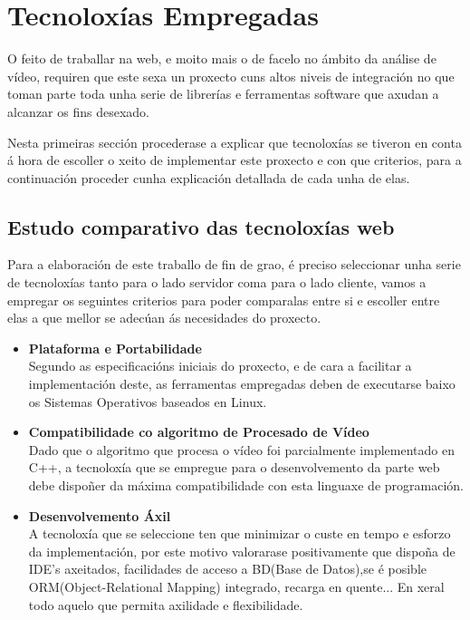\chapter{Tecnoloxías Empregadas}
    
    O feito de traballar na web, e moito mais o de facelo no ámbito da análise de vídeo, requiren 
    que este sexa un proxecto cuns altos niveis de integración no que toman parte toda unha serie 
    de librerías e ferramentas software que axudan a alcanzar os fins desexado.
    
    Nesta primeiras sección procederase a explicar que tecnoloxías se tiveron en conta á hora de 
    escoller o xeito de implementar este proxecto e con que criterios, para a continuación proceder
    cunha explicación detallada de cada unha de elas. 
    
    \section{Estudo comparativo das tecnoloxías web}
    \label{sec:estudoTecnoloxias}
    Para a elaboración de este traballo de fin de grao, é preciso seleccionar unha serie de
    tecnoloxías tanto para o lado servidor coma para o lado cliente, vamos a empregar os seguintes
    criterios para poder comparalas entre si e escoller entre elas a que mellor se adecúan ás 
    necesidades do proxecto.

    \begin{itemize}

        \item {\textbf{Plataforma e Portabilidade\\}}
            Segundo as especificacións iniciais do proxecto, e de cara a facilitar a 
            implementación deste, as ferramentas empregadas deben de executarse baixo os
            Sistemas Operativos baseados en Linux.

        \item {\textbf{Compatibilidade co algoritmo de Procesado de Vídeo\\}}
            Dado que o algoritmo que procesa o vídeo foi parcialmente implementado en C++,
            a tecnoloxía que se empregue para o desenvolvemento da parte web debe dispoñer da
            máxima compatibilidade con esta linguaxe de programación.

        \item {\textbf{Desenvolvemento Áxil\\}}
            A tecnoloxía que se seleccione ten que minimizar o custe en tempo e esforzo da 
            implementación, por este motivo valorarase positivamente que dispoña de IDE's axeitados,
            facilidades de acceso a BD(Base de Datos),se é posible ORM(Object-Relational Mapping) 
            integrado, recarga en quente... En xeral todo aquelo que permita axilidade e flexibilidade.

    \end{itemize}

